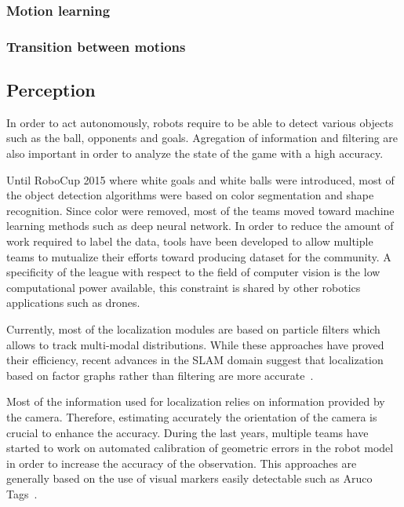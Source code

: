 \documentclass{article}
\begin{document}
\subsubsection{Motion learning}

\subsubsection{Transition between motions}



\subsection{Perception}

In order to act autonomously, robots require to be able to detect various
objects such as the ball, opponents and goals. Agregation of information and
filtering are also important in order to analyze the state of the game with a
high accuracy.

Until RoboCup 2015 where white goals and white balls were introduced, most of
the object detection algorithms were based on color segmentation and shape
recognition. Since color were removed, most of the teams moved toward machine
learning methods such as deep neural network. In order to reduce the amount of
work required to label the data, tools have been developed to allow multiple
teams to mutualize their efforts toward producing dataset for the community. A
specificity of the league with respect to the field of computer vision is the
low computational power available, this constraint is shared by other robotics
applications such as drones.

Currently, most of the localization modules are based on particle filters which
allows to track multi-modal distributions. While these approaches have proved
their efficiency, recent advances in the SLAM domain suggest that localization
based on factor graphs rather than filtering are more
accurate~\cite{Strasdat2012}.

Most of the information used for localization relies on information provided by
the camera. Therefore, estimating accurately the orientation of the camera is
crucial to enhance the accuracy. During the last years, multiple teams have
started to work on automated calibration of geometric errors in the robot model
in order to increase the accuracy of the observation. This approaches are
generally based on the use of visual markers easily detectable such as Aruco
Tags~\cite{Garrido-Jurado2014}.
\end{document}
